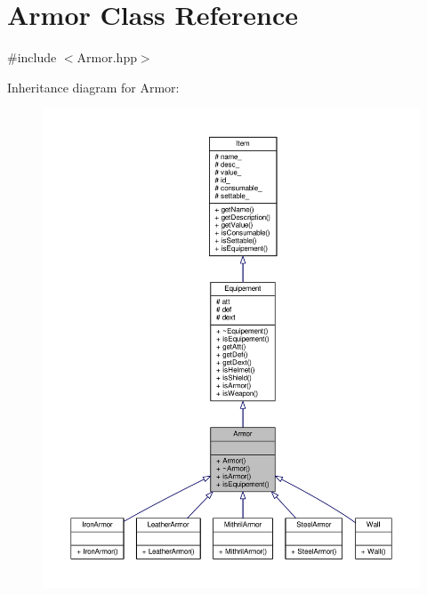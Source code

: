 \hypertarget{class_armor}{\section{Armor Class Reference}
\label{class_armor}
}


{\ttfamily \#include $<$Armor.\-hpp$>$}



Inheritance diagram for Armor\-:\nopagebreak
\begin{figure}[H]
\begin{center}
\leavevmode
\includegraphics[width=350pt]{class_armor__inherit__graph}
\end{center}
\end{figure}


